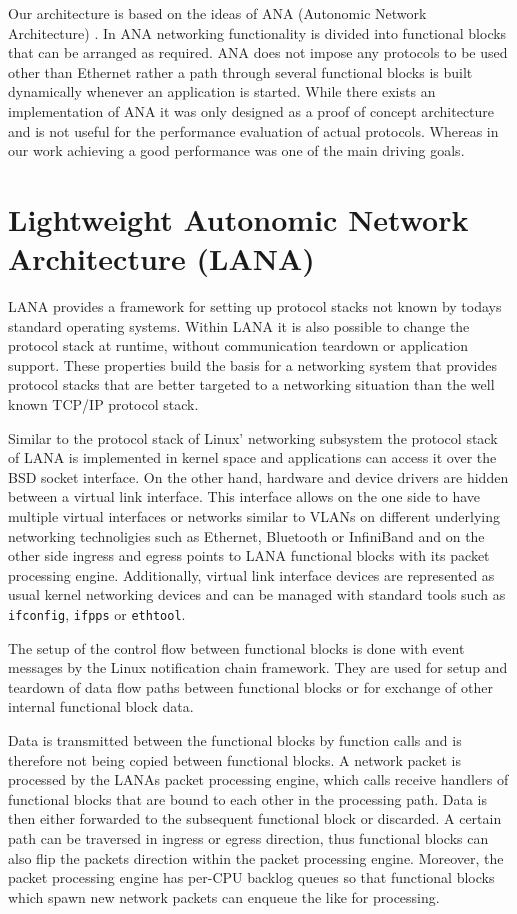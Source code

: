 \documentclass{sig-alternate}
\begin{document}
Our architecture is based on the ideas of ANA (Autonomic Network Architecture) \cite{ANAJournal}.
In ANA networking functionality is divided into functional blocks that can be arranged as required. ANA does not impose any protocols to be used other than Ethernet rather a path through several functional blocks is built dynamically whenever an application is started.   
While there exists an implementation of ANA it was only designed as a proof of concept architecture and is not useful for the performance evaluation of actual protocols. Whereas in our work achieving a good performance was one of the main driving goals. 


\section{Lightweight Autonomic Network Architecture (LANA)}

LANA provides a framework for setting up protocol stacks not known by 
todays standard operating systems. Within LANA it is also possible to 
change the protocol stack at runtime, without communication teardown or 
application support. These properties build the basis for a networking 
system that provides protocol stacks that are better targeted to a 
networking situation than the well known TCP/IP protocol stack.
 
Similar to the protocol stack of Linux' networking subsystem the protocol 
stack of LANA is implemented in kernel space and applications can access 
it over the BSD socket interface. On the other hand, hardware and device drivers are 
hidden between a virtual link interface. This interface allows on the 
one side to have multiple virtual interfaces or networks similar to 
VLANs on different underlying networking technoligies such as Ethernet, 
Bluetooth or InfiniBand and on the other side ingress and egress points to 
LANA functional blocks with its packet processing engine. Additionally, 
virtual link interface devices are represented as usual kernel networking 
devices and can be managed with standard tools such as \texttt{ifconfig}, 
\texttt{ifpps} or \texttt{ethtool}.

The setup of the control flow between functional blocks is done with event
messages by the Linux notification chain framework. They are used for setup 
and teardown of data flow paths between functional blocks or for exchange of
other internal functional block data.

Data is transmitted between the functional blocks by function calls and is 
therefore not being copied between functional blocks. A network packet is 
processed by the LANAs packet processing engine, which calls receive handlers 
of functional blocks that are bound to each other in the processing path. Data is then 
either forwarded to the subsequent functional block or discarded. A certain
path can be traversed in ingress or egress direction, thus functional
blocks can also flip the packets direction within the packet processing engine.
Moreover, the packet processing engine has per-CPU backlog queues so that
functional blocks which spawn new network packets can enqueue the like for
processing.
\end{document}
